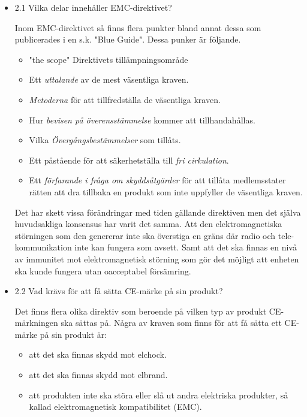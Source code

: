 \documentclass{article}
\begin{document}
\begin{itemize}
    \item 2.1 Vilka delar innehåller EMC‐direktivet?

        Inom EMC-direktivet så finns flera punkter bland annat dessa som publicerades i en s.k. "Blue Guide".  Dessa punker är följande. 
        \begin{itemize}
            \item "the scope" Direktivets tillämpningsområde
            \item Ett \textit{uttalande} av de mest väsentliga kraven.
            \item \textit{Metoderna} för att tillfredställa de väsentliga kraven.
            \item Hur \textit{bevisen på överensstämmelse} kommer att tillhandahållas.
            \item Vilka \textit{Övergångsbestämmelser} som tillåts.
            \item Ett påstående för att säkerhetställa till \textit{fri cirkulation}. 
            \item Ett \textit{förfarande i fråga om skyddsåtgärder} för att tillåta medlemsstater rätten att dra tillbaka en produkt som inte uppfyller de väsentliga kraven.
        \end{itemize}
        
        Det har skett vissa förändringar med tiden gällande direktiven men det själva huvudsakliga konsensus har varit det samma. Att den elektromagnetiska störningen som den genererar inte ska överstiga en gräns där radio och tele-kommunikation inte kan fungera som avsett. Samt att det ska finnas en nivå av immunitet mot elektromagnetisk störning som gör det möjligt att enheten ska kunde fungera utan oacceptabel försämring.   
            
    \item 2.2 Vad krävs för att få sätta CE‐märke på sin produkt?

        Det finns flera olika direktiv som beroende på vilken typ av produkt CE-märkningen ska sättas på. Några av kraven som finns för att få sätta  ett CE-märke på sin produkt är:
        \begin{itemize}
            \item att det ska finnas skydd mot elchock.
            \item att det ska finnas skydd mot elbrand.
            \item att produkten inte ska störa eller slå ut andra elektriska produkter, så kallad elektromagnetisk kompatibilitet (EMC).
        \end{itemize}
    

\end{itemize}
\end{document}
